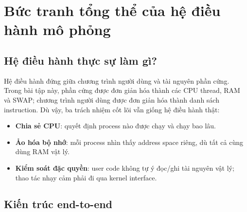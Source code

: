 \documentclass[12pt,a4paper]{article}
\newcommand{\term}[1]{\textbf{\color{bkblue}#1}}
\begin{document}
\tableofcontents
\newpage
{}

\section{Bức tranh tổng thể của hệ điều hành mô phỏng}

\subsection{Hệ điều hành thực sự làm gì?}

Hệ điều hành đứng giữa chương trình người dùng và tài nguyên phần cứng. Trong
bài tập này, phần cứng được đơn giản hóa thành các CPU thread, RAM và SWAP;
chương trình người dùng được đơn giản hóa thành danh sách instruction. Dù vậy,
ba trách nhiệm cốt lõi vẫn giống hệ điều hành thật:

\begin{itemize}
  \item \term{Chia sẻ CPU}: quyết định process nào được chạy và chạy bao lâu.
  \item \term{Ảo hóa bộ nhớ}: mỗi process nhìn thấy address space riêng, dù
  tất cả cùng dùng RAM vật lý.
  \item \term{Kiểm soát đặc quyền}: user code không tự ý đọc/ghi tài nguyên
  vật lý; thao tác nhạy cảm phải đi qua kernel interface.
\end{itemize}

\subsection{Kiến trúc end-to-end}
\end{document}
